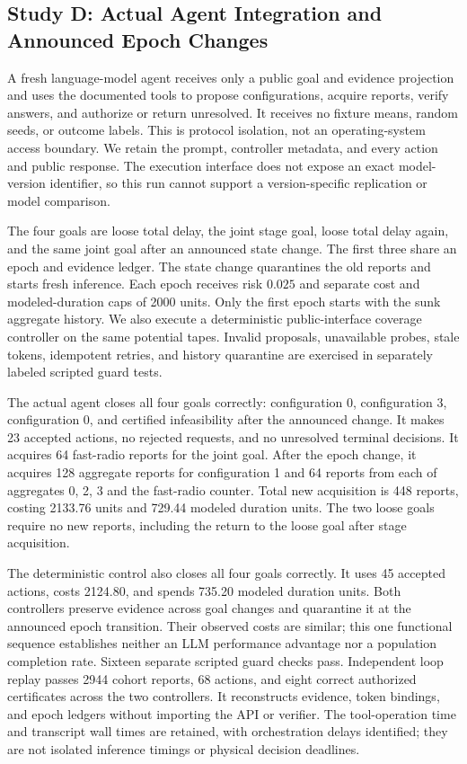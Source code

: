 \subsection{Study D: Actual Agent Integration and Announced Epoch Changes}

A fresh language-model agent receives only a public goal and evidence
projection and uses the documented tools to propose configurations, acquire
reports, verify answers, and authorize or return unresolved. It receives no
fixture means, random seeds, or outcome labels. This is protocol isolation,
not an operating-system access boundary. We retain the prompt, controller
metadata, and every action and public response. The execution interface does
not expose an exact model-version identifier, so this run cannot support a
version-specific replication or model comparison.

The four goals are loose total delay, the joint stage goal, loose total
delay again, and the same joint goal after an announced state change. The
first three share an epoch and evidence ledger. The state change quarantines
the old reports and starts fresh inference. Each epoch receives risk $0.025$
and separate cost and modeled-duration caps of 2000 units. Only the first
epoch starts with the sunk aggregate history. We also execute a deterministic
public-interface coverage controller on the same potential tapes. Invalid
proposals, unavailable probes, stale tokens, idempotent retries, and history
quarantine are exercised in separately labeled scripted guard tests.

The actual agent closes all four goals correctly: configuration $0$,
configuration $3$, configuration $0$, and certified infeasibility after the
announced change. It makes 23 accepted actions, no rejected requests, and
no unresolved terminal decisions. It acquires 64 fast-radio reports for the
joint goal. After the epoch change, it acquires 128 aggregate reports for
configuration 1 and 64 reports from each of aggregates 0, 2, 3 and the
fast-radio counter. Total new acquisition is 448 reports, costing 2133.76
units and 729.44 modeled duration units. The two loose goals require no new
reports, including the return to the loose goal after stage acquisition.

The deterministic control also closes all four goals correctly. It uses
45 accepted actions, costs 2124.80, and spends 735.20 modeled duration units.
Both controllers preserve evidence across goal changes and quarantine it at
the announced epoch transition. Their observed costs are similar; this one
functional sequence establishes neither an LLM performance advantage nor a
population completion rate. Sixteen separate scripted guard checks pass.
Independent loop replay passes 2944 cohort reports, 68 actions, and eight
correct authorized certificates across the two controllers. It reconstructs
evidence, token bindings, and epoch ledgers without importing the API or
verifier. The tool-operation time and transcript wall times are retained, with
orchestration delays identified; they are not isolated inference timings or
physical decision deadlines.


